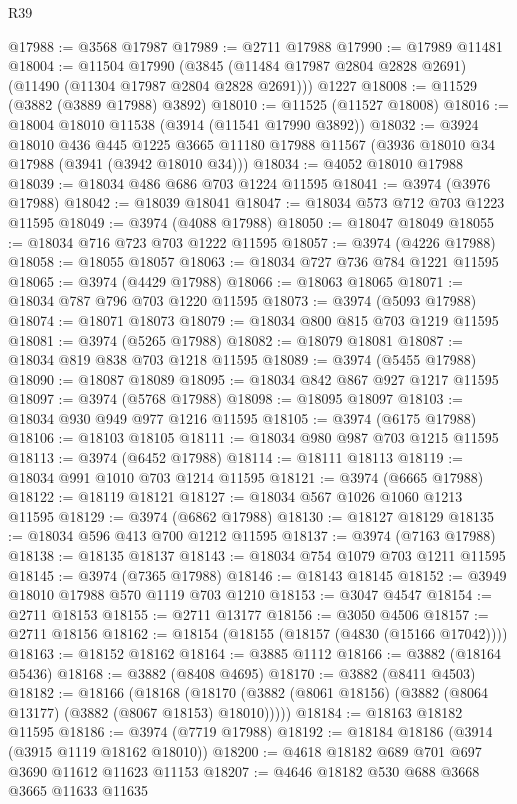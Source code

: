 \begin{lexlean}{R39}
\begin{coremodule}
@17988 := @3568 @17987
@17989 := @2711 @17988
@17990 := @17989 @11481
@18004 := @11504
    @17990
    (@3845 (@11484 @17987 @2804 @2828 @2691) (@11490 (@11304 @17987 @2804 @2828 @2691)))
    @1227
@18008 := @11529 (@3882 (@3889 @17988) @3892)
@18010 := @11525 (@11527 @18008)
@18016 := @18004 @18010 @11538 (@3914 (@11541 @17990 @3892))
@18032 := @3924
    @18010
    @436
    @445
    @1225
    @3665
    @11180
    @17988
    @11567
    (@3936 @18010 @34 @17988 (@3941 (@3942 @18010 @34)))
@18034 := @4052 @18010 @17988
@18039 := @18034 @486 @686 @703 @1224 @11595
@18041 := @3974 (@3976 @17988)
@18042 := @18039 @18041
@18047 := @18034 @573 @712 @703 @1223 @11595
@18049 := @3974 (@4088 @17988)
@18050 := @18047 @18049
@18055 := @18034 @716 @723 @703 @1222 @11595
@18057 := @3974 (@4226 @17988)
@18058 := @18055 @18057
@18063 := @18034 @727 @736 @784 @1221 @11595
@18065 := @3974 (@4429 @17988)
@18066 := @18063 @18065
@18071 := @18034 @787 @796 @703 @1220 @11595
@18073 := @3974 (@5093 @17988)
@18074 := @18071 @18073
@18079 := @18034 @800 @815 @703 @1219 @11595
@18081 := @3974 (@5265 @17988)
@18082 := @18079 @18081
@18087 := @18034 @819 @838 @703 @1218 @11595
@18089 := @3974 (@5455 @17988)
@18090 := @18087 @18089
@18095 := @18034 @842 @867 @927 @1217 @11595
@18097 := @3974 (@5768 @17988)
@18098 := @18095 @18097
@18103 := @18034 @930 @949 @977 @1216 @11595
@18105 := @3974 (@6175 @17988)
@18106 := @18103 @18105
@18111 := @18034 @980 @987 @703 @1215 @11595
@18113 := @3974 (@6452 @17988)
@18114 := @18111 @18113
@18119 := @18034 @991 @1010 @703 @1214 @11595
@18121 := @3974 (@6665 @17988)
@18122 := @18119 @18121
@18127 := @18034 @567 @1026 @1060 @1213 @11595
@18129 := @3974 (@6862 @17988)
@18130 := @18127 @18129
@18135 := @18034 @596 @413 @700 @1212 @11595
@18137 := @3974 (@7163 @17988)
@18138 := @18135 @18137
@18143 := @18034 @754 @1079 @703 @1211 @11595
@18145 := @3974 (@7365 @17988)
@18146 := @18143 @18145
@18152 := @3949 @18010 @17988 @570 @1119 @703 @1210
@18153 := @3047 @4547
@18154 := @2711 @18153
@18155 := @2711 @13177
@18156 := @3050 @4506
@18157 := @2711 @18156
@18162 := @18154 (@18155 (@18157 (@4830 (@15166 @17042))))
@18163 := @18152 @18162
@18164 := @3885 @1112
@18166 := @3882 (@18164 @5436)
@18168 := @3882 (@8408 @4695)
@18170 := @3882 (@8411 @4503)
@18182 := @18166
    (@18168 (@18170 (@3882 (@8061 @18156) (@3882 (@8064 @13177) (@3882 (@8067 @18153) @18010)))))
@18184 := @18163 @18182 @11595
@18186 := @3974 (@7719 @17988)
@18192 := @18184 @18186 (@3914 (@3915 @1119 @18162 @18010))
@18200 := @4618 @18182 @689 @701 @697 @3690 @11612 @11623 @11153
@18207 := @4646 @18182 @530 @688 @3668 @3665 @11633 @11635

\end{coremodule}
\end{lexlean}
